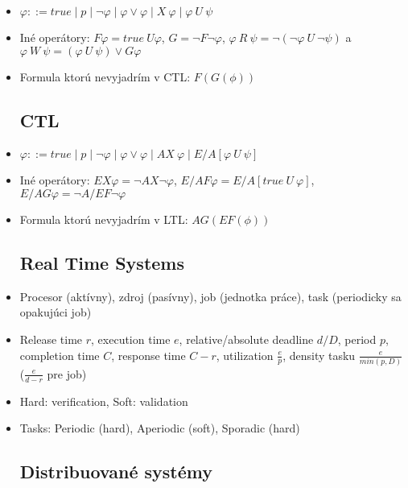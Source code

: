 \documentclass[paper=a4, fontsize=11pt]{scrartcl} %
\numberwithin{equation}{section} %
\numberwithin{figure}{section} %
\numberwithin{table}{section} %
\begin{document}
\begin{itemize}
	\item $\varphi ::= true \mid p \mid \neg \varphi \mid \varphi \lor \varphi \mid X\ \varphi \mid \varphi\ U\ \psi$
	
	\item Iné operátory: $F\varphi = true\ U \varphi$, $G = \neg F \neg \varphi$, $\varphi\ R\ \psi = \neg (\neg \varphi\ U\ \neg \psi)$ a $\varphi\ W\ \psi = (\varphi\ U\ \psi) \lor G \varphi$
	
	\item Formula ktorú nevyjadrím v CTL: $F(G(\phi))$
	
	\subsection{CTL}
	
	\item $\varphi ::= true \mid p \mid \neg \varphi \mid \varphi \lor \varphi \mid AX\ \varphi \mid E/A [\varphi\ U\ \psi]$
	
	\item Iné operátory: $EX \varphi = \neg AX \neg \varphi$, $E/AF \varphi = E/A[true\ U\ \varphi]$, $E/AG \varphi = \neg A/EF \neg \varphi$
	
	\item Formula ktorú nevyjadrím v LTL: $AG(EF(\phi))$
	
	\subsection{Real Time Systems}
	
	\item Procesor (aktívny), zdroj (pasívny), job (jednotka práce), task (periodicky sa opakujúci job)
	
	\item Release time $r$, execution time $e$, relative/absolute deadline $d/D$, period $p$, completion time $C$, response time $C - r$, utilization $\frac{e}{p}$, density tasku $\frac{e}{min(p, D)}$ ($\frac{e}{d - r}$ pre job)
	
	\item Hard: verification, Soft: validation
	
	\item Tasks: Periodic (hard), Aperiodic (soft), Sporadic (hard)
	
	\subsection{Distribuované systémy}
	

\end{itemize}
\end{document}
